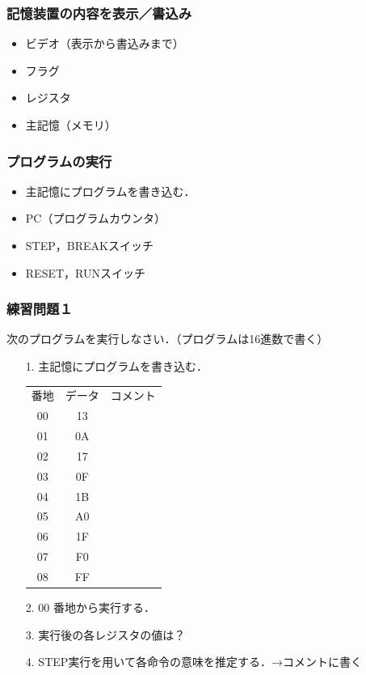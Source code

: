 \documentclass[handout]{beamer}         %
\begin{document}
\begin{frame}
  \frametitle{記憶装置の内容を表示／書込み}
  \begin{itemize}
    \item ビデオ（表示から書込みまで）
    \item フラグ
    \item レジスタ
    \item 主記憶（メモリ）
  \end{itemize}
  \vfill
  \vfill
  \vfill
\end{frame}

\begin{frame}
  \frametitle{プログラムの実行}
  \begin{itemize}
    \item 主記憶にプログラムを書き込む．
    \item PC（プログラムカウンタ）
    \item STEP，BREAKスイッチ
    \item RESET，RUNスイッチ
  \end{itemize}
  \vfill
  \vfill
  \vfill
\end{frame}

\begin{frame}
  \frametitle{練習問題１}
  次のプログラムを実行しなさい．（プログラムは16進数で書く）
  \begin{enumerate}
    \item[1.] 主記憶にプログラムを書き込む．\\
      \begin{tabular}{c c l}
        番地 & データ & コメント \\
        00   & 13     &          \\
        01   & 0A     &          \\
        02   & 17     &          \\
        03   & 0F     &          \\
        04   & 1B     &          \\
        05   & A0     &          \\
        06   & 1F     &          \\
        07   & F0     &          \\
        08   & FF     &          \\
      \end{tabular}
    \item[2.] 00 番地から実行する．
    \item[3.] 実行後の各レジスタの値は？
    \item[4.] STEP実行を用いて各命令の意味を推定する．→コメントに書く
  \end{enumerate}
\end{frame}
\end{document}
